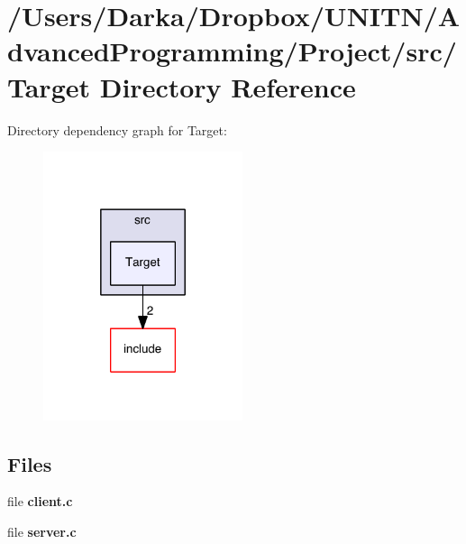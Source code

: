 \section{/\+Users/\+Darka/\+Dropbox/\+U\+N\+I\+T\+N/\+Advanced\+Programming/\+Project/src/\+Target Directory Reference}
\label{dir_e0b29b4faa44f936da6e85bdab5c4f4e}
Directory dependency graph for Target\+:\nopagebreak
\begin{figure}[H]
\begin{center}
\leavevmode
\includegraphics[width=166pt]{dir_e0b29b4faa44f936da6e85bdab5c4f4e_dep}
\end{center}
\end{figure}
\subsection*{Files}
\begin{DoxyCompactItemize}
\item 
file {\bf client.\+c}
\item 
file {\bf server.\+c}
\end{DoxyCompactItemize}
